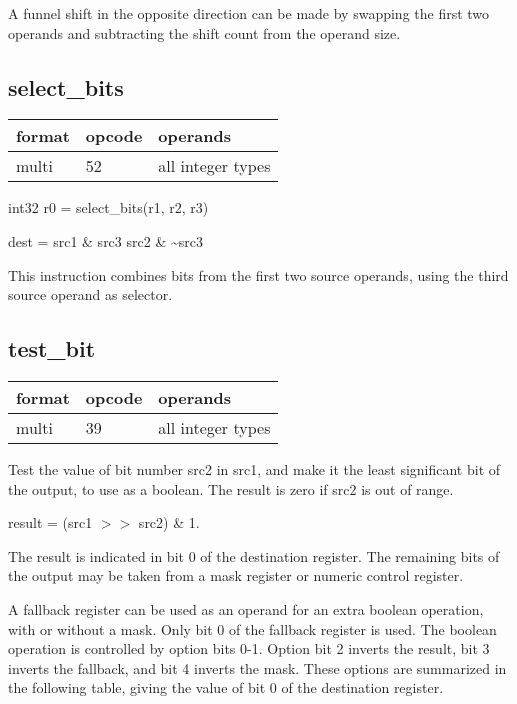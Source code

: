 \documentclass[forwardcom.tex]{subfiles}
\begin{document}
A funnel shift in the opposite direction can be made by swapping the first two operands and subtracting the shift count from the operand size.
\vv


\subsection{select\_bits}
\label{table:selectBitsInstruction}
\begin{tabular}{|p{12mm}|p{15mm}|p{100mm}|}
\hline
\bfseries format & \bfseries opcode & \bfseries operands \\ \hline
multi & 52 & all integer types \\ \hline
\end{tabular}
\vv

int32 r0 = select\_bits(r1, r2, r3)
\vv

dest = src1 \& src3 \textbar{} src2 \& \~{}src3
\vv

This instruction combines bits from the first two source operands, using the third source operand as selector.
\vv


\subsection{test\_bit}
\label{table:testBitInstruction}
\begin{tabular}{|p{12mm}|p{15mm}|p{100mm}|}
\hline
\bfseries format & \bfseries opcode & \bfseries operands \\ \hline
multi & 39 & all integer types \\ \hline
\end{tabular}
\vv

Test the value of bit number src2 in src1, and make it the least significant bit of the output, to use as a boolean. The result is zero if src2 is out of range.
\vv

result = (src1 $>>$ src2) \& 1.
\vv

The result is indicated in bit 0 of the destination register. 
The remaining bits of the output may be taken from a mask register or numeric control register.
\vv

A fallback register can be used as an operand for an extra boolean operation, with or without a mask. Only bit 0 of the fallback register is used. 
The boolean operation is controlled by option bits 0-1. 
Option bit 2 inverts the result, bit 3 inverts the fallback, and bit 4 inverts the mask. These options are summarized in the following table, giving the value of bit 0 of the destination register.
\end{document}
